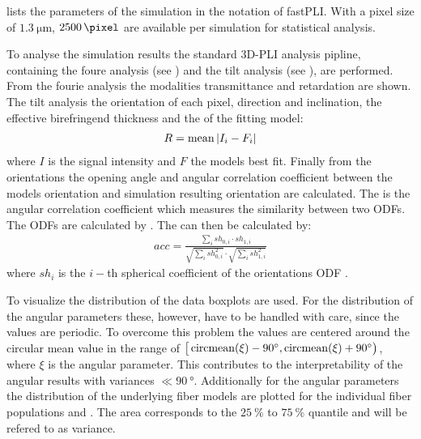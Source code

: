 % 
 lists the parameters of the simulation in the notation of \ac{fastPLI}.
With a pixel size of $\SI{1.3}{\micro\meter}$, $\SI{2500}{\pixel}$ are available per simulation for statistical analysis.
\par
% 
To analyse the simulation results the standard \ac{3D-PLI} analysis pipline, containing the foure analysis (see \dummy{}) and the tilt analysis (see \dummy{}), are performed.
From the fourie analysis the modalities transmittance and retardation are shown.
The tilt analysis \dummy{} the orientation of each pixel, \ie{} direction and inclination, the effective birefringend thickness \trel{} and the \rvalue{} of the fitting model:
\begin{align}
    R = \operatorname{mean}{|I_i-F_i|}
\end{align}
where $I$ is the signal intensity and $F$ the models best fit.
Finally from the orientations the opening angle \openingAngle{} and angular correlation coefficient \accvalue{} between the models orientation and simulation resulting orientation are calculated.
The \accvalue{} is the angular correlation coefficient which measures the similarity between two \acp{ODF}. The \acp{ODF} are calculated by \dummy{}. The \accvalue{} can then be calculated by:
\begin{align}
    acc = \frac{\sum_i{\mathit{sh}_{0,i} \cdot \mathit{sh}_{1,i}}}{\sqrt{\sum_i{\mathit{sh}_{0,i}^2}} \cdot \sqrt{\sum_i{\mathit{sh}_{1,i}^2}}}
\end{align}
where $\mathit{sh}_i$ is the $i-$th spherical coefficient of the orientations \ac{ODF} \cite{Schilling2018}.
\par
%
To visualize the distribution of the data boxplots are used.
For the distribution of the angular parameters these, however, have to be handled with care, since the values are periodic.
To overcome this problem the values are centered around the circular mean value in the range of $\big[\operatorname{circmean} (\xi)-\SI{90}{\degree}, \operatorname{circmean}(\xi)+\SI{90}{\degree}\big)$, where $\xi$ is the angular parameter.
This contributes to the interpretability of the angular results with variances $\ll \SI{90}{\degree}$.
Additionally for the angular parameters the distribution of the underlying fiber models are plotted for the individual fiber populations \popa{} and \popb{}.
The area corresponds to the $\SI{25}{\percent}$ to $\SI{75}{\percent}$ quantile and will be refered to as \bvariance{} variance.
% 
% 
% 
